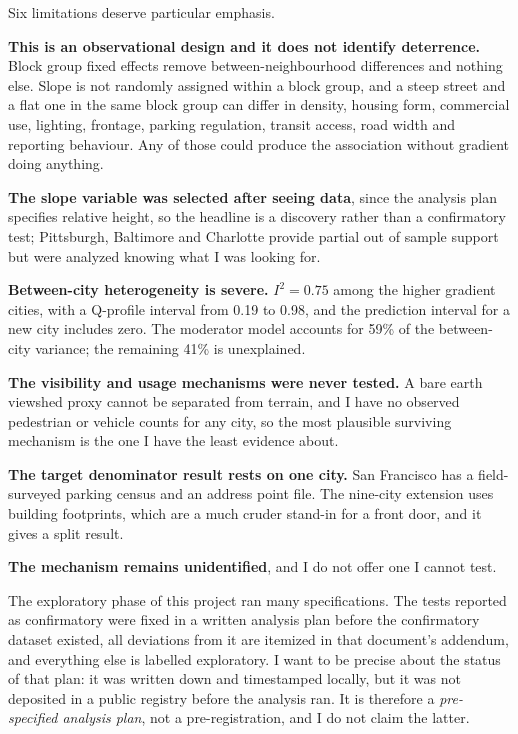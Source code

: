 \documentclass[10pt,letterpaper]{article}
\begin{document}
Six limitations deserve particular emphasis.

\textbf{This is an observational design and it does not identify deterrence.} Block
group fixed effects remove between-neighbourhood differences and nothing else. Slope
is not randomly assigned within a block group, and a steep street and a flat one in
the same block group can differ in density, housing form, commercial use, lighting,
frontage, parking regulation, transit access, road width and reporting behaviour. Any
of those could produce the association without gradient doing anything.

\textbf{The slope variable was selected after seeing data}, since the analysis plan
specifies relative height, so the headline is a discovery rather than a confirmatory
test; Pittsburgh, Baltimore and Charlotte provide partial out of sample support but
were analyzed knowing what I was looking for.

\textbf{Between-city heterogeneity is severe.} $I^2 = 0.75$ among the higher gradient
cities, with a Q-profile interval from 0.19 to 0.98, and the prediction interval for
a new city includes zero. The moderator model accounts for 59\% of the between-city
variance; the remaining 41\% is unexplained.

\textbf{The visibility and usage mechanisms were never tested.} A bare earth viewshed
proxy cannot be separated from terrain, and I have no observed pedestrian or vehicle
counts for any city, so the most plausible surviving mechanism is the one I have the
least evidence about.

\textbf{The target denominator result rests on one city.} San Francisco has a
field-surveyed parking census and an address point file. The nine-city extension uses
building footprints, which are a much cruder stand-in for a front door, and it gives a
split result.

\textbf{The mechanism remains unidentified}, and I do not offer one I cannot test.

The exploratory phase of this project ran many specifications. The tests reported as
confirmatory were fixed in a written analysis plan before the confirmatory dataset
existed, all deviations from it are itemized in that document's addendum, and
everything else is labelled exploratory. I want to be precise about the status of that
plan: it was written down and timestamped locally, but it was not deposited in a
public registry before the analysis ran. It is therefore a \emph{pre-specified
analysis plan}, not a pre-registration, and I do not claim the latter.
\end{document}
